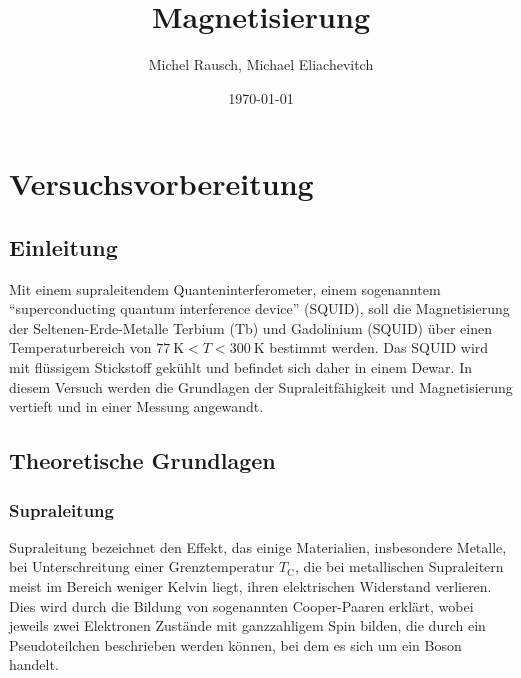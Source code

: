 \documentclass[a4paper,ngerman]{scrartcl}
\title{Magnetisierung}
\date{\today}
\author{Michel Rausch, Michael Eliachevitch}
\begin{document}
\maketitle
\tableofcontents
\newpage

\section{Versuchsvorbereitung}

\subsection{Einleitung}


Mit einem supraleitendem Quanteninterferometer, einem sogenanntem
"`superconducting quantum interference device"' (SQUID), soll
die Magnetisierung der Seltenen-Erde-Metalle Terbium (Tb) und
Gadolinium (SQUID) über einen Temperaturbereich von 
$\SI{77}{\kelvin} < T < \SI{300}{\kelvin}$ bestimmt werden.
Das SQUID wird mit flüssigem Stickstoff gekühlt und befindet sich
daher in einem Dewar. In diesem Versuch werden die Grundlagen der
Supraleitfähigkeit und Magnetisierung vertieft und in einer Messung
angewandt.


\subsection{Theoretische Grundlagen}

\subsubsection{Supraleitung}

Supraleitung bezeichnet den Effekt, das einige Materialien,
insbesondere Metalle, bei Unterschreitung einer Grenztemperatur
$T_{\mathrm{C}}$, die bei metallischen Supraleitern meist im Bereich
weniger Kelvin liegt, ihren elektrischen Widerstand verlieren.
Dies wird durch die Bildung von sogenannten Cooper-Paaren erklärt,
wobei jeweils zwei Elektronen Zustände mit ganzzahligem
Spin bilden, die durch ein Pseudoteilchen beschrieben werden können,
bei dem es sich um ein Boson handelt.
\end{document}
